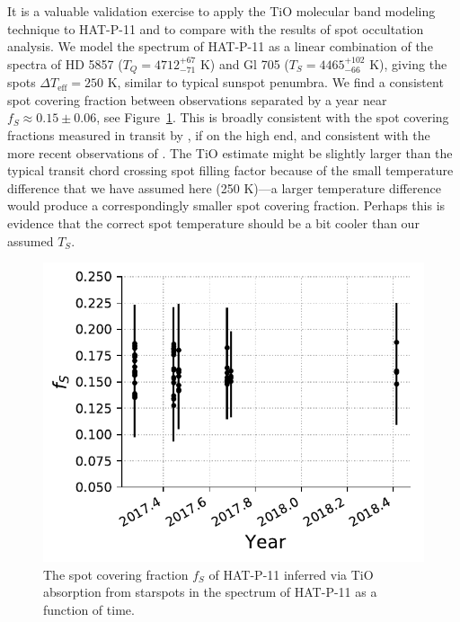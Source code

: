 It is a valuable validation exercise to apply the TiO molecular band modeling technique to HAT-P-11 and to compare with the results of spot occultation analysis. We model the spectrum of HAT-P-11 as a linear combination of the spectra of HD 5857 ($T_Q = 4712^{+67}_{-71}$ K) and Gl 705 ($T_S = 4465^{+102}_{-66}$ K), giving the spots $\Delta T_\mathrm{eff} = 250$ K, similar to typical sunspot penumbra. We find a consistent spot covering fraction between observations separated by a year near $f_S \approx 0.15 \pm 0.06$, see Figure~\ref{fig:h11}. This is 
broadly consistent with the spot covering fractions measured in transit by \citet{Morris2017a}, if on the high end, and consistent with the more recent observations of \citet{Morris2018d}. The TiO estimate might be slightly larger than the typical transit chord crossing spot filling factor because of the small temperature difference that we have assumed here (250 K)---a larger temperature difference would produce a correspondingly smaller spot covering fraction. Perhaps this is evidence that the correct spot temperature should be a bit cooler than our assumed $T_S$. 

\begin{figure}
    \centering
    \includegraphics[scale=0.8]{freckles/h11_timeseries.pdf}
    \caption{The spot covering fraction $f_S$ of HAT-P-11 inferred via TiO absorption from starspots in the spectrum of HAT-P-11 as a function of time. }
    \label{fig:h11}
\end{figure}

